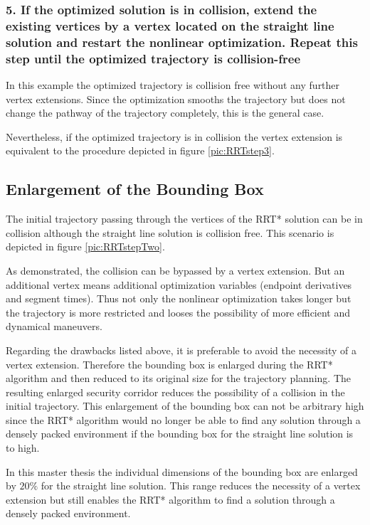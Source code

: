 \subsubsection{5. If the optimized solution is in collision, extend the existing vertices by a vertex located on the straight line solution and restart the nonlinear optimization. Repeat this step until the optimized trajectory is collision-free}
In this example the optimized trajectory is collision free without any further vertex extensions. Since the optimization smooths the trajectory but does not change the pathway of the trajectory completely, this is the general case. \newline

Nevertheless, if the optimized trajectory is in collision the vertex extension is equivalent to the procedure depicted in figure \ref{pic:RRTstep3}.

\subsection{Enlargement of the Bounding Box}\label{sec:enlargementBBX}

The initial trajectory passing through the vertices of the RRT* solution can be in collision although the straight line solution is collision free. This scenario is depicted in figure \ref{pic:RRTstepTwo}. \newline

As demonstrated, the collision can be bypassed by a vertex extension. But an additional vertex means additional optimization variables (endpoint derivatives and segment times). Thus not only the nonlinear optimization takes longer but the trajectory is more restricted and looses the possibility of more efficient and dynamical maneuvers.  \newline

Regarding the drawbacks listed above, it is preferable to avoid the necessity of a vertex extension. Therefore the bounding box is enlarged during the RRT* algorithm and then reduced to its original size for the trajectory planning. The resulting enlarged security corridor reduces the possibility of a collision in the initial trajectory. This enlargement of the bounding box can not be arbitrary high since the RRT* algorithm would no longer be able to find any solution through a densely packed environment if the bounding box for the straight line solution is to high. \newline

In this master thesis the individual dimensions of the bounding box are enlarged by $20\%$ for the straight line solution. This range reduces the necessity of a vertex extension but still enables the RRT* algorithm to find a solution through a densely packed environment.
%

